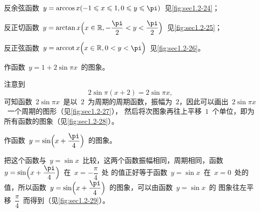 反余弦函数~$y=\arccos x\Paren{-1\leq x\leq1,0\leq y\leq\pi}$~见\ref{fig:sec1.2-24}；

反正切函数~$y=\arctan x\Paren[\Big]{x\in\FR,-\dfrac\pi2<y<\dfrac\pi2}$~见\ref{fig:sec1.2-25}；

反正弦函数~$y=\arccot x\Paren[\Big]{x\in\FR,0<y<\pi}$~见\ref{fig:sec1.2-26}。

\begin{figure}
\begin{floatrow}
\begin{minipage}{.4\hsize}
          {\somefigure}
          {\somefigure}
\end{minipage}\qquad
\begin{minipage}{.4\hsize}
          {\somefigure}
          {\somefigure}
\end{minipage}
\end{floatrow}
\end{figure}

\begin{example}
作函数~$y=1+2\sin\pi x$~的图象。
\end{example}
\begin{solution}
注意到
\[
  2\sin\pi(x+2)=2\sin\pi x,
\]
可知函数~$2\sin\pi x$~是以~$2$~为周期的周期函数，振幅为~$2$，因此可以画出~$2\sin\pi x$~一个周期的图形（见\ref{fig:sec1.2-27}），%
然后将次图象再往上平移~$1$~个单位，即为所有函数的图象（见\ref{fig:sec1.2-28}）。
\end{solution}

\begin{figure}
\begin{floatrow}[2]
\figurebox{\caption{}\label{fig:sec1.2-27}}
          {\somefigure}
\figurebox{\caption{}\label{fig:sec1.2-28}}
          {\somefigure}
\end{floatrow}
\end{figure}

\begin{example}
  作函数~$y=\sin\Paren[\Big]{x+\dfrac\pi4}$~的图象。
\end{example}

把这个函数与~$y=\sin x$~比较，这两个函数振幅相同，周期相同，函数~$y=\sin\Paren[\Big]{x+\dfrac\pi4}$~在~$x=-\dfrac\pi4$~处
的值正好等于函数~$y=\sin x$~在~$x=0$~处的值，所以函数~$y=\sin\Paren[\Big]{x+\dfrac\pi4}$~的图象，可以由函数~$y=\sin x$~的
图象往左平移~$\dfrac\pi4$~而得到（见\ref{fig:sec1.2-29}）。

